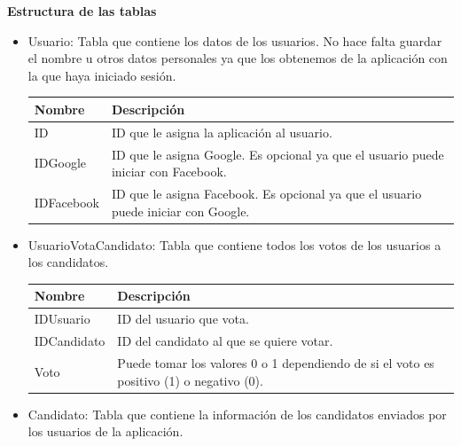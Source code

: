 \newpage

\textbf{Estructura de las tablas}

\begin{itemize}
\item Usuario: Tabla que contiene los datos de los usuarios. No hace falta guardar el nombre u otros datos personales ya que los obtenemos de la aplicación con la que haya iniciado sesión.


\begin{tabularx}{14cm}{|l|X|}
\hline
\textbf{Nombre} & \textbf{Descripción}                                                              \\ \hline
ID              & ID que le asigna la aplicación al usuario.                                         \\ \hline
IDGoogle        & ID que le asigna Google. Es opcional ya que el usuario puede iniciar con Facebook. \\ \hline
IDFacebook      & ID que le asigna Facebook. Es opcional ya que el usuario puede iniciar con Google. \\ \hline
\end{tabularx}
\vspace{1em}

\item UsuarioVotaCandidato: Tabla que contiene todos los votos de los usuarios a los candidatos.

\begin{tabularx}{14cm}{|l|X|}
\hline
\textbf{Nombre} & \textbf{Descripción}                                                              \\ \hline
IDUsuario       & ID del usuario que vota.                                                           \\ \hline
IDCandidato     & ID del candidato al que se quiere votar.                                           \\ \hline
Voto            & Puede tomar los valores 0 o 1 dependiendo de si el voto es positivo (1) o negativo (0). \\ \hline
\end{tabularx}
\vspace{1em}

\item Candidato: Tabla que contiene la información de los candidatos enviados por los usuarios de la aplicación.


\end{itemize}
